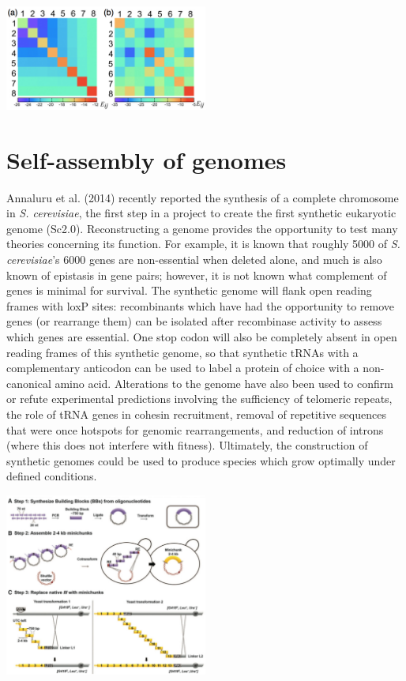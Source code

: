 \documentclass{article}
\begin{document}
\begin{center}
\includegraphics[width=0.5\textwidth]{venev3.pdf}
\end{center}

\section*{Self-assembly of genomes}

Annaluru et al. (2014) recently reported the synthesis of a complete chromosome in \textit{S. cerevisiae}, the first step in a project to create the first synthetic eukaryotic genome (Sc2.0). Reconstructing a genome provides the opportunity to test many theories concerning its function. For example, it is known that roughly 5000 of \textit{S. cerevisiae}'s 6000 genes are non-essential when deleted alone, and much is also known of epistasis in gene pairs; however, it is not known what complement of genes is minimal for survival. The synthetic genome will flank open reading frames with loxP sites: recombinants which have had the opportunity to remove genes (or rearrange them) can be isolated after recombinase activity to assess which genes are essential. One stop codon will also be completely absent in open reading frames of this synthetic genome, so that synthetic tRNAs with a complementary anticodon can be used to label a protein of choice with a non-canonical amino acid. Alterations to the genome have also been used to confirm or refute experimental predictions involving the sufficiency of telomeric repeats, the role of tRNA genes in cohesin recruitment, removal of repetitive sequences that were once hotspots for genomic rearrangements, and reduction of introns (where this does not interfere with fitness). Ultimately, the construction of synthetic genomes could be used to produce species which grow optimally under defined conditions.

\begin{center}
\includegraphics[width=0.5\textwidth]{annaluru.pdf}
\end{center}
\end{document}
